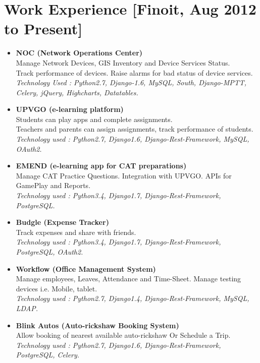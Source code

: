 \documentclass[12pt]{article}
\begin{document}
\section*{Work Experience [Finoit, Aug 2012 to Present]}
\begin{itemize}
 \item \textbf{NOC (Network Operations Center)}
    \\ Manage Network Devices, GIS Inventory and Device Services Status.
    \\ Track performance of devices. Raise alarms for bad status of device services.
    \\ \textit{Technology Used : Python2.7, Django-1.6, MySQL, South, Django-MPTT, Celery, jQuery, Highcharts, Datatables.}
 \item \textbf{UPVGO (e-learning platform)}
    \\ Students can play apps and complete assignments.
    \\ Teachers and parents can assign assignments, track performance of students.
    \\ \textit{Technology used : Python2.7, Django1.6, Django-Rest-Framework, MySQL, OAuth2.}
 \item \textbf{EMEND (e-learning app for CAT preparations)}
    \\ Manage CAT Practice Questions. Integration with UPVGO. APIs for GamePlay and Reports.
    \\ \textit{Technology used : Python3.4, Django1.7, Django-Rest-Framework, PostgreSQL.}
 \item \textbf{Budgle (Expense Tracker)}
    \\ Track expenses and share with friends.
    \\ \textit{Technology used : Python3.4, Django1.7, Django-Rest-Framework, PostgreSQL, OAuth2.}
 \item \textbf{Workflow (Office Management System)}
    \\ Manage employees, Leaves, Attendance and Time-Sheet. Manage testing devices i.e. Mobile, tablet.
    \\ \textit{Technology used : Python2.7, Django1.4, Django-Rest-Framework, MySQL, LDAP.}
 \item \textbf{Blink Autos (Auto-rickshaw Booking System)}
    \\ Allow booking of nearest available auto-rickshaw Or Schedule a Trip.
    \\ \textit{Technology used : Python2.7, Django1.6, Django-Rest-Framework, PostgreSQL, Celery.}
\end{itemize}
\end{document}
